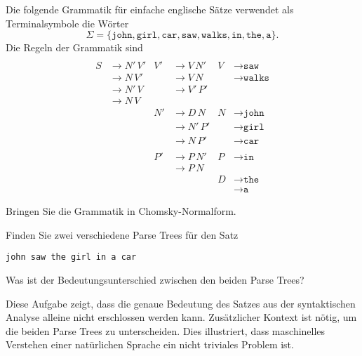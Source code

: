 Die folgende Grammatik für einfache englische Sätze verwendet
als Terminalsymbole die Wörter
\[
\Sigma
=
\{
\texttt{john},
\texttt{girl},
\texttt{car},
\texttt{saw},
\texttt{walks},
\texttt{in},
\texttt{the},
\texttt{a}
\}.
\]
Die Regeln der Grammatik sind
\begin{align*}
\\
S&\to N'\, V'
& V'&\to V\, N'
& V &\to \texttt{saw}
\\
  &\to N\, V'
  &&\to V\, N
  &&\to \texttt{walks}
\\
  &\to N'\, V
  &&\to V'\, P'
\\
 &\to N\, V
\\
  &
  &N'&\to D\, N
  &N &\to \texttt{john}
\\
  &&
  &\to N'\,P'
  &&\to \texttt{girl}
\\
  &
  &&\to N\, P'
  &&\to \texttt{car}
\\
\\
  &
  &P'&\to P\,N'
  &P&\to \texttt{in}
\\
  &
  &&\to P\, N
\\
  &
  &&
  &D&\to \texttt{the}
\\
  &
  &&
  &&\to \texttt{a}
\end{align*}
\begin{teilaufgaben}
\item
Bringen Sie die
Grammatik in Chomsky-Normalform.
\item
Finden Sie zwei verschiedene Parse Trees für den Satz
\begin{center}
\texttt{john saw the girl in a car}
\end{center}
\item Was ist der Bedeutungsunterschied zwischen den beiden Parse Trees?
\end{teilaufgaben}
Diese Aufgabe zeigt, dass die genaue Bedeutung des Satzes aus der
syntaktischen Analyse alleine nicht erschlossen werden kann.
Zusätzlicher Kontext ist nötig, um die beiden Parse Trees zu unterscheiden.
Dies illustriert, dass maschinelles Verstehen einer natürlichen
Sprache ein nicht triviales Problem ist.

